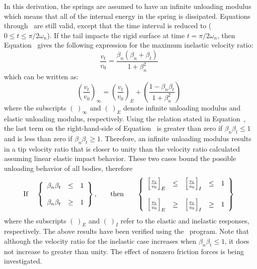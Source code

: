 In this derivation, the springs are assumed to have an infinite
unloading modulus which means that all of the internal energy in the
spring is dissipated.  Equations  through~ are
still valid, except that the time interval is reduced to ($0\leq t\leq
\pi / 2\omega_n$).  If the tail impacts the rigid surface at time
$t=\pi/2\omega_n$, then Equation~ gives the following
expression for the maximum inelastic velocity ratio: 
\begin{equation}
\frac{v_t}{v_0} = \frac{\beta_n(\beta_n+\beta_t)}{1+\beta_n^2}
\label{eq:vrv0i}
\end{equation}
which can be written as:
\begin{equation}
\left(\frac{v_t}{v_0}\right)_\infty = \left(\frac{v_t}{v_0}\right)_E + 
  \left(\frac{1-\beta_n\beta_t}{1+\beta_n^2}\right)\label{eisum}
\end{equation}
where the subscripts $(\ )_\infty$ and $(\ )_E$ denote infinite
unloading modulus and elastic unloading modulus, respectively.  Using
the relation stated in Equation~, the last term on the
right-hand-side of Equation~ is greater than zero 
if $\beta_n\beta_t\leq1$ and is less than zero if $\beta_n\beta_t\geq1$.
Therefore, an infinite unloading modulus results in a tip velocity
ratio that is closer to unity than the velocity ratio calculated
assuming linear elastic impact behavior.  These two cases bound the
possible unloading behavior of all bodies, therefore
\begin{displaymath}
\begin{array}{cccc}
{\rm If\;} &
   \left\{\begin{array}{rcl}
       \beta_n\beta_t & \leq & 1\\
       {} & {} & {}\\
       \beta_n\beta_t & \geq & 1
   \end{array}\right\}, &
{\quad\rm then\quad} &
   \left\{\begin{array}{rclcl}
       \left[\frac{v_t}{v_0}\right]_E & \leq & 
                       \left[\frac{v_t}{v_0}\right]_I & \leq & 1\\
       {} & {} & {} & {} & {}\\
       \left[\frac{v_t}{v_0}\right]_E & \geq & 
                       \left[\frac{v_t}{v_0}\right]_I & \geq & 1
   \end{array}\right\}
\end{array}
\end{displaymath}
where the subscripts $(\ )_E$ and $(\ )_I$ refer to the elastic and
inelastic responses, respectively. The above results have been verified
using the \SLAP\ program. Note that although the velocity
ratio for the inelastic case increases when $\beta_n\beta_t \leq  1$, it
does not increase to greater than unity.  The effect of nonzero friction
forces is being investigated. 

